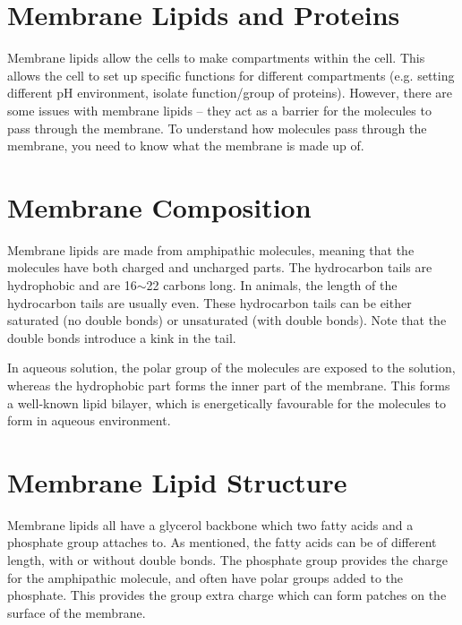 \section{Membrane Lipids and Proteins}

Membrane lipids allow the cells to make compartments within the cell.
This allows the cell to set up specific functions for different compartments (e.g. setting different pH environment, isolate function/group of proteins).
However, there are some issues with membrane lipids -- they act as a barrier for the molecules to pass through the membrane.
To understand how molecules pass through the membrane, you need to  know what the membrane is made up of.

\section{Membrane Composition}

\begin{center}
\end{center}

Membrane lipids are made from amphipathic molecules, meaning that the molecules have both charged and uncharged parts.
The hydrocarbon tails are hydrophobic and are 16$\sim$22 carbons long.
In animals, the length of the hydrocarbon tails are usually even.
These hydrocarbon tails can be either saturated (no double bonds) or unsaturated (with double bonds).
Note that the double bonds introduce a kink in the tail.

In aqueous solution, the polar group of the molecules are exposed to the solution, whereas the hydrophobic part forms the inner part of the membrane.
This forms a well-known lipid bilayer, which is energetically favourable for the molecules to form in aqueous environment.

\section{Membrane Lipid Structure}

Membrane lipids all have a glycerol backbone which two fatty acids and a phosphate group attaches to.
As mentioned, the fatty acids can be of different length, with or without double bonds.
The phosphate group provides the charge for the amphipathic molecule, and often have polar groups added to the phosphate.
This provides the group extra charge which can form patches on the surface of the membrane.

